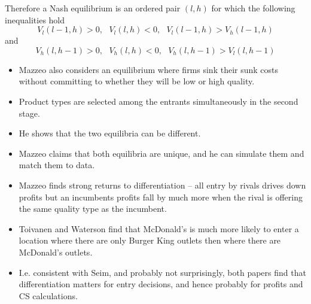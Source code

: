 \begin{frame}%


Therefore a Nash equilibrium is an ordered pair $(l,h)$ for which the
following inequalities hold 
\begin{equation*}
V_{l}(l-1,h)>0,\text{ }V_{l}(l,h)<0,\text{ }V_{l}(l-1,h)>V_{h}(l-1,h)
\end{equation*}%
and 
\begin{equation*}
V_{h}(l,h-1)>0,\text{ }V_{h}(l,h)<0,\text{ }V_{h}(l,h-1)>V_{l}(l,h-1)
\end{equation*}

\begin{itemize}
\item Mazzeo also considers an equilibrium where firms sink their sunk costs
without committing to whether they will be low or high quality.

\item Product types are selected among the entrants simultaneously in the
second stage.

\item He shows that the two equilibria can be different.

\item Mazzeo claims that both equilibria are unique, and he can simulate
them and match them to data.
\end{itemize}

\end{frame}%

\begin{frame}%


\begin{itemize}
\item Mazzeo finds strong returns to differentiation -- all entry by rivals
drives down profits but an incumbents profits fall by much more when the
rival is offering the same quality type as the incumbent.

\item Toivanen and Waterson find that McDonald's is much more likely to
enter a location where there are only Burger King outlets then where there
are McDonald's outlets.

\item I.e. consistent with Seim, and probably not surprisingly, both papers
find that differentiation matters for entry decisions, and hence probably
for profits and CS calculations.
\end{itemize}

\end{frame}%

